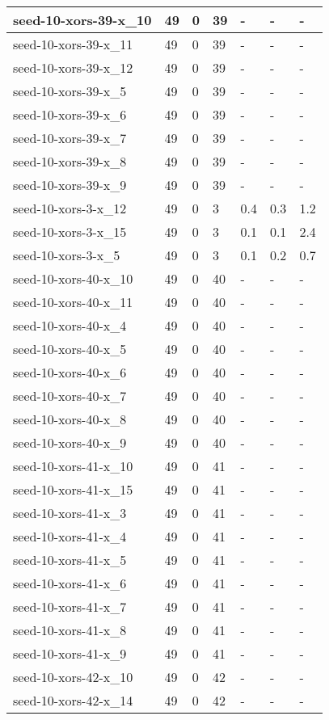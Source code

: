 \begin{scriptsize}
\begin{longtable}{|p{5cm}|l|l|l|l|l|l|}
seed-10-xors-39-x\_10&49&0&39&-&-&- \\ \hline 
seed-10-xors-39-x\_11&49&0&39&-&-&- \\ \hline 
seed-10-xors-39-x\_12&49&0&39&-&-&- \\ \hline 
seed-10-xors-39-x\_5&49&0&39&-&-&- \\ \hline 
seed-10-xors-39-x\_6&49&0&39&-&-&- \\ \hline 
seed-10-xors-39-x\_7&49&0&39&-&-&- \\ \hline 
seed-10-xors-39-x\_8&49&0&39&-&-&- \\ \hline 
seed-10-xors-39-x\_9&49&0&39&-&-&- \\ \hline 
seed-10-xors-3-x\_12&49&0&3&0.4&0.3&1.2 \\ \hline 
seed-10-xors-3-x\_15&49&0&3&0.1&0.1&2.4 \\ \hline 
seed-10-xors-3-x\_5&49&0&3&0.1&0.2&0.7 \\ \hline 
seed-10-xors-40-x\_10&49&0&40&-&-&- \\ \hline 
seed-10-xors-40-x\_11&49&0&40&-&-&- \\ \hline 
seed-10-xors-40-x\_4&49&0&40&-&-&- \\ \hline 
seed-10-xors-40-x\_5&49&0&40&-&-&- \\ \hline 
seed-10-xors-40-x\_6&49&0&40&-&-&- \\ \hline 
seed-10-xors-40-x\_7&49&0&40&-&-&- \\ \hline 
seed-10-xors-40-x\_8&49&0&40&-&-&- \\ \hline 
seed-10-xors-40-x\_9&49&0&40&-&-&- \\ \hline 
seed-10-xors-41-x\_10&49&0&41&-&-&- \\ \hline 
seed-10-xors-41-x\_15&49&0&41&-&-&- \\ \hline 
seed-10-xors-41-x\_3&49&0&41&-&-&- \\ \hline 
seed-10-xors-41-x\_4&49&0&41&-&-&- \\ \hline 
seed-10-xors-41-x\_5&49&0&41&-&-&- \\ \hline 
seed-10-xors-41-x\_6&49&0&41&-&-&- \\ \hline 
seed-10-xors-41-x\_7&49&0&41&-&-&- \\ \hline 
seed-10-xors-41-x\_8&49&0&41&-&-&- \\ \hline 
seed-10-xors-41-x\_9&49&0&41&-&-&- \\ \hline 
seed-10-xors-42-x\_10&49&0&42&-&-&- \\ \hline 
seed-10-xors-42-x\_14&49&0&42&-&-&- \\ \hline 

\end{longtable}
\end{scriptsize}
